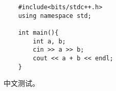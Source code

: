 \documentclass{ctexart}
\begin{document}
\begin{verbatim}
    #include<bits/stdc++.h>
    using namespace std;

    int main(){
        int a, b;
        cin >> a >> b;
        cout << a + b << endl;
    }
\end{verbatim}

中文测试。
\end{document}
